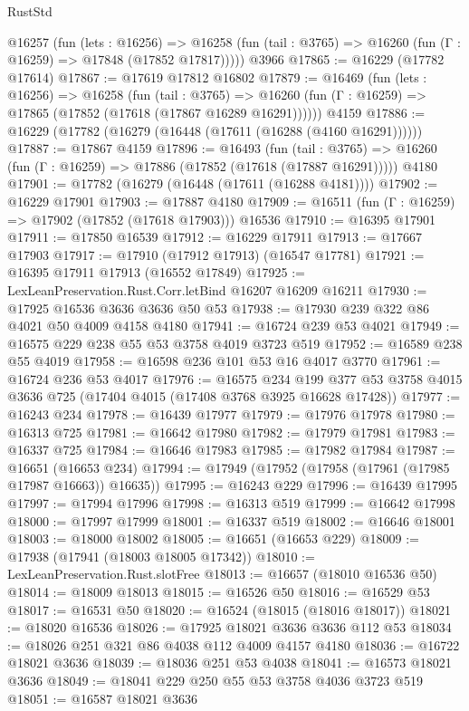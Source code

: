 \begin{lexlean}{RustStd}
\begin{coremodule}
    @16257
      (fun (lets : @16256) =>
      @16258 (fun (tail : @3765) => @16260 (fun (Γ : @16259) => @17848 (@17852 @17817)))))
    @3966
@17865 := @16229 (@17782 @17614)
@17867 := @17619 @17812 @16802
@17879 := @16469
    (fun (lets : @16256) =>
    @16258
      (fun (tail : @3765) =>
      @16260 (fun (Γ : @16259) => @17865 (@17852 (@17618 (@17867 @16289 @16291))))))
    @4159
@17886 := @16229 (@17782 (@16279 (@16448 (@17611 (@16288 (@4160 @16291))))))
@17887 := @17867 @4159
@17896 := @16493
    (fun (tail : @3765) => @16260 (fun (Γ : @16259) => @17886 (@17852 (@17618 (@17887 @16291)))))
    @4180
@17901 := @17782 (@16279 (@16448 (@17611 (@16288 @4181))))
@17902 := @16229 @17901
@17903 := @17887 @4180
@17909 := @16511 (fun (Γ : @16259) => @17902 (@17852 (@17618 @17903))) @16536
@17910 := @16395 @17901
@17911 := @17850 @16539
@17912 := @16229 @17911
@17913 := @17667 @17903
@17917 := @17910 (@17912 @17913) (@16547 @17781)
@17921 := @16395 @17911 @17913 (@16552 @17849)
@17925 := LexLeanPreservation.Rust.Corr.letBind @16207 @16209 @16211
@17930 := @17925 @16536 @3636 @3636 @50 @53
@17938 := @17930 @239 @322 @86 @4021 @50 @4009 @4158 @4180
@17941 := @16724 @239 @53 @4021
@17949 := @16575 @229 @238 @55 @53 @3758 @4019 @3723 @519
@17952 := @16589 @238 @55 @4019
@17958 := @16598 @236 @101 @53 @16 @4017 @3770
@17961 := @16724 @236 @53 @4017
@17976 := @16575
    @234
    @199
    @377
    @53
    @3758
    @4015
    @3636
    @725
    (@17404 @4015 (@17408 @3768 @3925 @16628 @17428))
@17977 := @16243 @234
@17978 := @16439 @17977
@17979 := @17976 @17978
@17980 := @16313 @725
@17981 := @16642 @17980
@17982 := @17979 @17981
@17983 := @16337 @725
@17984 := @16646 @17983
@17985 := @17982 @17984
@17987 := @16651 (@16653 @234)
@17994 := @17949 (@17952 (@17958 (@17961 (@17985 @17987 @16663)) @16635))
@17995 := @16243 @229
@17996 := @16439 @17995
@17997 := @17994 @17996
@17998 := @16313 @519
@17999 := @16642 @17998
@18000 := @17997 @17999
@18001 := @16337 @519
@18002 := @16646 @18001
@18003 := @18000 @18002
@18005 := @16651 (@16653 @229)
@18009 := @17938 (@17941 (@18003 @18005 @17342))
@18010 := LexLeanPreservation.Rust.slotFree
@18013 := @16657 (@18010 @16536 @50)
@18014 := @18009 @18013
@18015 := @16526 @50
@18016 := @16529 @53
@18017 := @16531 @50
@18020 := @16524 (@18015 (@18016 @18017))
@18021 := @18020 @16536
@18026 := @17925 @18021 @3636 @3636 @112 @53
@18034 := @18026 @251 @321 @86 @4038 @112 @4009 @4157 @4180
@18036 := @16722 @18021 @3636
@18039 := @18036 @251 @53 @4038
@18041 := @16573 @18021 @3636
@18049 := @18041 @229 @250 @55 @53 @3758 @4036 @3723 @519
@18051 := @16587 @18021 @3636

\end{coremodule}
\end{lexlean}
